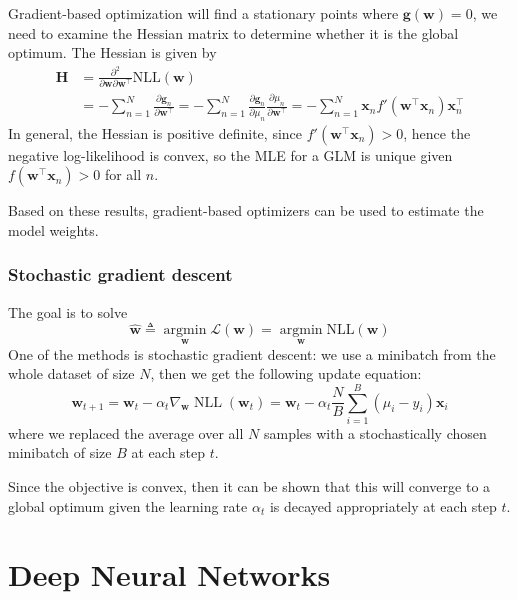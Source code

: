 \documentclass[11pt]{article}
\begin{document}
Gradient-based optimization will find a stationary points where $\boldsymbol{g(w)} = 0$, we need to examine the Hessian matrix to determine whether it is the global optimum. The Hessian is given by 
\[
\begin{aligned}
\boldsymbol{H} &= \frac{\partial^2}{\partial \boldsymbol{w}\partial \boldsymbol{w}^\top}\text{NLL}(\boldsymbol{w}) \\ 
&= -\sum_{n=1}^N \frac{\partial \boldsymbol{g}_n}{\partial \boldsymbol{w}^\top}
= -\sum_{n=1}^N \frac{\partial \boldsymbol{g}_n}{\partial \mu_n}\frac{\partial \mu_n}{\partial \boldsymbol{w}^\top}
= -\sum_{n=1}^N \boldsymbol{x}_n f'(\boldsymbol{w}^\top \boldsymbol{x}_n)\boldsymbol{x}_n^\top
\end{aligned} 
\]
In general, the Hessian is positive definite, since $f'(\boldsymbol{w}^\top \boldsymbol{x}_n) > 0$, hence the negative log-likelihood is convex, so the MLE for a GLM is unique given $f(\boldsymbol{w}^\top \boldsymbol{x}_n) > 0$ for all $n$.

Based on these results, gradient-based optimizers can be used to estimate the model weights.

\subsubsection*{Stochastic gradient descent}

The goal is to solve
\[
\hat{\boldsymbol{w}} \triangleq \operatorname*{argmin}_{\boldsymbol{w}} \mathcal{L}(\boldsymbol{w}) = \operatorname*{argmin}_{\boldsymbol{w}} \text{NLL}({\boldsymbol{w}})
\]
One of the methods is stochastic gradient descent: we use a minibatch from the whole dataset of size $N$, then we get the following update equation:
\[
\boldsymbol{w}_{t+1}
= \boldsymbol{w}_t - \alpha_t \nabla_{\boldsymbol{w}}\operatorname{NLL}(\boldsymbol{w}_t)
= \boldsymbol{w}_t - \alpha_t \frac{N}{B}\sum_{i=1}^{B} (\mu_i - y_i)\boldsymbol{x}_i
\]
where we replaced the average over all $N$ samples with a stochastically chosen minibatch of size $B$ at each step $t$.

Since the objective is convex, then it can be shown that this will converge to a global optimum given the learning rate $\alpha_t$ is decayed appropriately at each step $t$.

\clearpage
\section{Deep Neural Networks}
\end{document}
